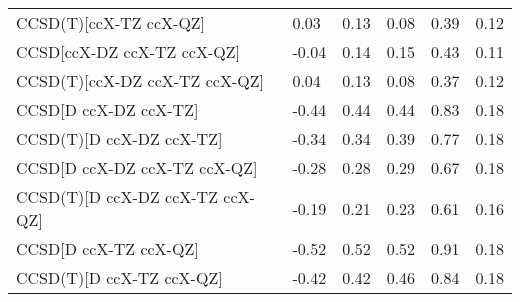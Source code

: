 \begin{table}
\begin{tabular}{l l l l l l }
    CCSD(T)[ccX-TZ ccX-QZ] & 0.03 & 0.13 & 0.08 & 0.39 & 0.12 \\ 
    CCSD[ccX-DZ ccX-TZ ccX-QZ] & -0.04 & 0.14 & 0.15 & 0.43 & 0.11 \\ 
    CCSD(T)[ccX-DZ ccX-TZ ccX-QZ] & 0.04 & 0.13 & 0.08 & 0.37 & 0.12 \\ 
    CCSD[D ccX-DZ ccX-TZ] & -0.44 & 0.44 & 0.44 & 0.83 & 0.18 \\ 
    CCSD(T)[D ccX-DZ ccX-TZ] & -0.34 & 0.34 & 0.39 & 0.77 & 0.18 \\ 
    CCSD[D ccX-DZ ccX-TZ ccX-QZ] & -0.28 & 0.28 & 0.29 & 0.67 & 0.18 \\ 
    CCSD(T)[D ccX-DZ ccX-TZ ccX-QZ] & -0.19 & 0.21 & 0.23 & 0.61 & 0.16 \\ 
    CCSD[D ccX-TZ ccX-QZ] & -0.52 & 0.52 & 0.52 & 0.91 & 0.18 \\ 
    CCSD(T)[D ccX-TZ ccX-QZ] & -0.42 & 0.42 & 0.46 & 0.84 & 0.18 \\ 
    \bottomrule
  \end{tabular}
\end{table}
